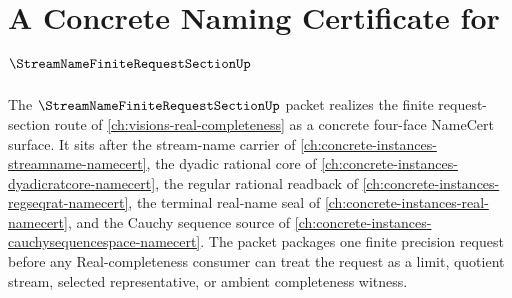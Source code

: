 \chapter{A Concrete Naming Certificate for $\StreamNameFiniteRequestSectionUp$}
\label{ch:concrete-instances-streamname-finite-request-section-namecert}

The $\StreamNameFiniteRequestSectionUp$ packet realizes the finite request-section route of \autoref{ch:visions-real-completeness} as a concrete four-face NameCert surface. It sits after the stream-name carrier of \autoref{ch:concrete-instances-streamname-namecert}, the dyadic rational core of \autoref{ch:concrete-instances-dyadicratcore-namecert}, the regular rational readback of \autoref{ch:concrete-instances-regseqrat-namecert}, the terminal real-name seal of \autoref{ch:concrete-instances-real-namecert}, and the Cauchy sequence source of \autoref{ch:concrete-instances-cauchysequencespace-namecert}. The packet packages one finite precision request before any Real-completeness consumer can treat the request as a limit, quotient stream, selected representative, or ambient completeness witness.

